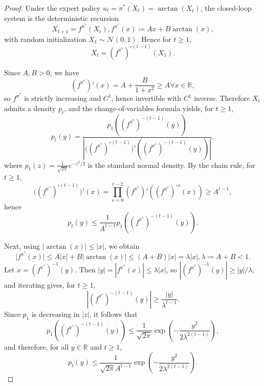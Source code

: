 \documentclass{article}
\begin{document}
\begin{proof}
Under the expert policy $u_t=\pi^*(X_t)=\arctan(X_t)$, the closed-loop system is the deterministic recursion
\begin{equation*}
X_{t+1}=f^{\pi^*}(X_t),f^{\pi^*}(x)\coloneqq Ax+B\arctan(x),
\end{equation*}
with random initialization $X_1\sim \mathcal N(0,1)$. Hence for $t\ge 1$,
\begin{equation*}
X_t=(f^{\pi^*})^{\circ (t-1)}(X_1).
\end{equation*}

Since $A,B>0$, we have
\begin{equation*}
(f^{\pi^*})'(x)=A+\frac{B}{1+x^2}\ge A \forall x\in\mathbb R,
\end{equation*}
so $f^{\pi^*}$ is strictly increasing and $C^1$, hence invertible with $C^1$ inverse.
Therefore $X_t$ admits a density $p_t$, and the change-of-variables formula yields, for $t\ge 1$,
\begin{equation*}
p_t(y)=\frac{p_1\left((f^{\pi^*})^{-(t-1)}(y)\right)}{\left|\big((f^{\pi^*})^{\circ (t-1)}\big)'\left((f^{\pi^*})^{-(t-1)}(y)\right)\right|},
\end{equation*}
where $p_1(z)=\frac{1}{\sqrt{2\pi}}e^{-z^2/2}$ is the standard normal density.
By the chain rule, for $t\ge 1$,
\begin{equation*}
\big((f^{\pi^*})^{\circ (t-1)}\big)'(x)=\prod_{s=0}^{t-2}(f^{\pi^*})'\left((f^{\pi^*})^{\circ s}(x)\right)\ge A^{t-1},
\end{equation*}
hence
\begin{equation*}
p_t(y)\le \frac{1}{A^{t-1}}p_1\left((f^{\pi^*})^{-(t-1)}(y)\right).
\end{equation*}

Next, using $|\arctan(x)|\le |x|$, we obtain
\begin{equation*}
\bigl|f^{\pi^*}(x)\bigr|
\le A|x|+B|\arctan(x)|
\le (A+B)|x|
=\lambda|x|,\lambda\coloneqq A+B<1.
\end{equation*}
Let $x=(f^{\pi^*})^{-1}(y)$. Then $|y|=|f^{\pi^*}(x)|\le \lambda|x|$, so
$|(f^{\pi^*})^{-1}(y)|\ge |y|/\lambda$, and iterating gives, for $t\ge 1$,
\begin{equation*}
\left|(f^{\pi^*})^{-(t-1)}(y)\right|\ge \frac{|y|}{\lambda^{t-1}}.
\end{equation*}
Since $p_1$ is decreasing in $|z|$, it follows that
\begin{equation*}
p_1\left((f^{\pi^*})^{-(t-1)}(y)\right)
\le \frac{1}{\sqrt{2\pi}}
\exp\left(-\frac{y^2}{2\lambda^{2(t-1)}}\right),
\end{equation*}
and therefore, for all $y\in\mathbb R$ and $t\ge 1$,
\begin{equation*}
p_t(y)\le \frac{1}{\sqrt{2\pi}A^{t-1}}
\exp\left(-\frac{y^2}{2\lambda^{2(t-1)}}\right).
\end{equation*}


\end{proof}
\end{document}
